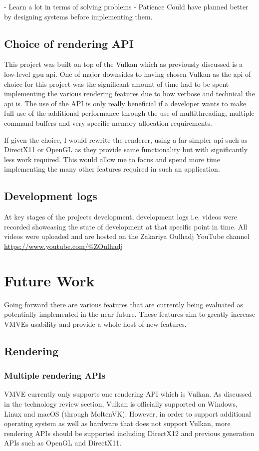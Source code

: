 \documentclass[11pt]{article}
\begin{document}
- Learn a lot in terms of solving problems
- Patience
Could have planned better by designing systems before implementing them.


\subsection{Choice of rendering API}
This project was built on top of the Vulkan which as previously discussed is a
low-level \gls{gpu} \gls{api}. One of major downsides to having chosen Vulkan as
the \gls{api} of choice for this project was the significant amount of time had
to be spent implementing the various rendering features due to how verbose and
technical the \gls{api} is. The use of the API is only really beneficial if a
developer wants to make full use of the additional performance through the use
of multithreading, multiple command buffers and very specific memory allocation
requirements.

If given the choice, I would rewrite the renderer, using a far simpler \gls{api}
such as DirectX11 or OpenGL as they provide same functionality but with
significantly less work required. This would allow me to focus and spend more time 
implementing the many other features required in such an application.

\subsection{Development logs}
At key stages of the projects development, development logs i.e. videos were
recorded showcasing the state of development at that specific point in time. All
videos were uploaded and are hosted on the Zakariya Oulhadj YouTube channel
\url{https://www.youtube.com/@ZOulhadj}

\section{Future Work}
Going forward there are various features that are currently being evaluated as
potentially implemented in the near future. These features aim to greatly
increase VMVEs usability and provide a whole host of new features.

\subsection{Rendering}

\subsubsection{Multiple rendering APIs}
VMVE currently only supports one rendering API which is Vulkan. As discussed in
the technology review section, Vulkan is officially supported on Windows, Linux
and macOS (through MoltenVK). However, in order to support additional operating
system as well as hardware that does not support Vulkan, more rendering APIs
should be supported including DirectX12 and previous generation APIs such as
OpenGL and DirectX11.
\end{document}
